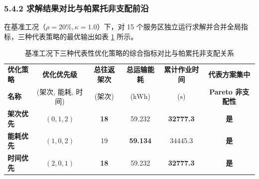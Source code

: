 \documentclass[12pt,a4paper,UTF8]{ctexart}
\begin{document}
\subsubsection{5.4.2 求解结果对比与帕累托非支配前沿}
在基准工况（$\rho=20\%, \kappa=1.0$）下，对 15 个服务区独立运行求解并合并全局指标，三种代表策略的最优输出如表 \ref{tab:tradeoff} 所示。

\begin{table}[H]
\centering
\caption{基准工况下三种代表性优化策略的综合指标对比与帕累托非支配关系}
\label{tab:tradeoff}
\begin{tabularx}{\textwidth}{l c c c c c}
\toprule
\textbf{优化策略} & \textbf{优化优先级} & \textbf{总往返架次} & \textbf{总运输能耗} & \textbf{累计作业时间} & \textbf{代表方案集中} \\
\textbf{名称} & (架次, 能耗, 时间) & (架次) & ($\text{kWh}$) & ($\text{s}$) & \textbf{Pareto 非支配性} \\
\midrule
\textbf{架次优先} & $(0, 1, 2)$ & \textbf{18} & 59.232 & \textbf{32777.3} & \textbf{是} \\
\textbf{能耗优先} & $(1, 0, 2)$ & 19 & \textbf{59.134} & 34445.3 & \textbf{是} \\
\textbf{时间优先} & $(2, 0, 1)$ & \textbf{18} & 59.232 & \textbf{32777.3} & \textbf{是} \\
\bottomrule
\end{tabularx}
\end{table}
\end{document}
